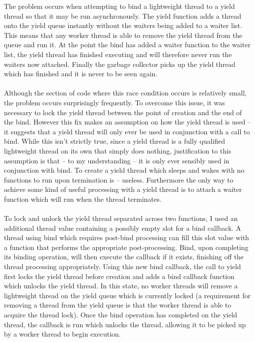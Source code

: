 \documentclass[12pt,twoside,notitlepage]{report}
\begin{document}
The problem occurs when attempting to bind a lightweight thread to a yield thread so that it may be run asynchronously. The yield function adds a thread onto the yield queue instantly without the waiters being added to a waiter list. This means
that any worker thread is able to remove the yield thread from the queue and run it. At the point the bind has added a waiter function to the waiter list, the yield thread has finished executing and will therefore never run the
waiters now attached. Finally the garbage collector picks up the yield thread which has finished and it is never to be seen again. 
\hfill\\
\hfill\\
%
%
Although the section of code where this race condition occurs is relatively small, the problem occurs surprisingly frequently. To overcome this issue, it was necessary to lock the yield thread between the point of creation
and the end of the bind. However this fix makes an assumption on how the yield thread is used -- it suggests that a yield thread will only ever be used in conjunction with a call to bind. While this isn't strictly true, since a yield
thread is a fully qualified lightweight thread on its own that simply does nothing, justification to this assumption is that -- to my understanding -- it is only ever sensibly used in conjunction with bind. To create a yield thread which sleeps
and wakes with no functions to run upon termination is -- useless. Furthermore the only way to achieve some kind of useful processing with a yield thread is to attach a waiter function which will run when the thread terminates.
\hfill\\
\hfill\\
To lock and unlock the yield thread separated across two functions, I used an additional thread value containing a possibly empty slot for a bind callback. A thread using bind which requires post-bind processing can fill this slot value with
a function that performs the appropriate post-processing. Bind, upon completing its binding operation, will then execute the callback if it exists, finishing off the thread processing appropriately. Using this new bind callback, the
call to yield first locks the yield thread before creation and adds a bind callback function which unlocks the yield thread. In this state, no worker threads will remove a lightweight thread on the yield queue which is currently locked (a requirement
for removing a thread from the yield queue is that the worker thread is able to acquire the thread lock). Once the bind operation has completed on the yield thread, the callback is run which unlocks the thread, allowing it to be
picked up by a worker thread to begin execution.
%
%
\end{document}
